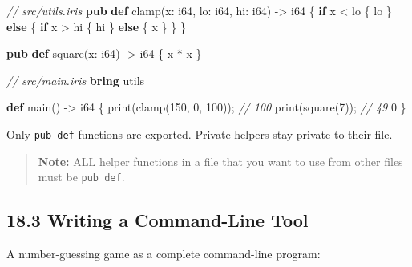 \documentclass[
  english,
]{book}
\newenvironment{Shaded}{\begin{snugshade}}{\end{snugshade}}
\newcommand{\CommentTok}[1]{\textcolor[rgb]{0.42,0.60,0.33}{\textit{#1}}}
\newcommand{\ControlFlowTok}[1]{\textcolor[rgb]{0.77,0.53,0.75}{\textbf{#1}}}
\newcommand{\DataTypeTok}[1]{\textcolor[rgb]{0.31,0.79,0.69}{#1}}
\newcommand{\DecValTok}[1]{\textcolor[rgb]{0.71,0.81,0.66}{#1}}
\newcommand{\FunctionTok}[1]{\textcolor[rgb]{0.86,0.86,0.67}{#1}}
\newcommand{\KeywordTok}[1]{\textcolor[rgb]{0.34,0.61,0.84}{\textbf{#1}}}
\newcommand{\NormalTok}[1]{\textcolor[rgb]{0.83,0.83,0.83}{#1}}
\newcommand{\OperatorTok}[1]{\textcolor[rgb]{0.83,0.83,0.83}{#1}}
\begin{document}
\begin{Shaded}
\begin{Highlighting}[]
\CommentTok{// src/utils.iris}
\KeywordTok{pub} \KeywordTok{def} \FunctionTok{clamp}\NormalTok{(x: }\DataTypeTok{i64}\NormalTok{, lo: }\DataTypeTok{i64}\NormalTok{, hi: }\DataTypeTok{i64}\NormalTok{) }\OperatorTok{{-}\textgreater{}} \DataTypeTok{i64}\NormalTok{ \{}
    \ControlFlowTok{if}\NormalTok{ x }\OperatorTok{\textless{}}\NormalTok{ lo \{ lo \} }\ControlFlowTok{else}\NormalTok{ \{ }\ControlFlowTok{if}\NormalTok{ x }\OperatorTok{\textgreater{}}\NormalTok{ hi \{ hi \} }\ControlFlowTok{else}\NormalTok{ \{ x \} \}}
\NormalTok{\}}

\KeywordTok{pub} \KeywordTok{def}\NormalTok{ square(x: }\DataTypeTok{i64}\NormalTok{) }\OperatorTok{{-}\textgreater{}} \DataTypeTok{i64}\NormalTok{ \{}
\NormalTok{    x }\OperatorTok{*}\NormalTok{ x}
\NormalTok{\}}
\end{Highlighting}
\end{Shaded}

\begin{Shaded}
\begin{Highlighting}[]
\CommentTok{// src/main.iris}
\KeywordTok{bring}\NormalTok{ utils}

\KeywordTok{def}\NormalTok{ main() }\OperatorTok{{-}\textgreater{}} \DataTypeTok{i64}\NormalTok{ \{}
    \FunctionTok{print}\NormalTok{(}\FunctionTok{clamp}\NormalTok{(}\DecValTok{150}\NormalTok{, }\DecValTok{0}\NormalTok{, }\DecValTok{100}\NormalTok{));   }\CommentTok{// 100}
    \FunctionTok{print}\NormalTok{(square(}\DecValTok{7}\NormalTok{));            }\CommentTok{// 49}
    \DecValTok{0}
\NormalTok{\}}
\end{Highlighting}
\end{Shaded}

Only \texttt{pub\ def} functions are exported. Private helpers stay
private to their file.

\begin{quote}
\textbf{Note:} ALL helper functions in a file that you want to use from
other files must be \texttt{pub\ def}.
\end{quote}

\subsection{18.3 Writing a Command-Line
Tool}\label{writing-a-command-line-tool}

A number-guessing game as a complete command-line program:
\end{document}
